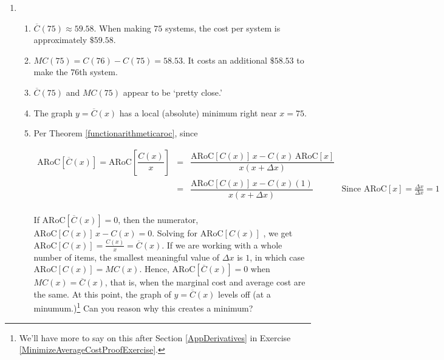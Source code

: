 \begin{enumerate}
\begin{enumerate}
\end{enumerate}

\item \begin{enumerate}  \item $\overline{C}(75) \approx 59.58$.  When making $75$ systems, the cost per system is approximately $\$ 59.58$.

\item $MC(75) = C(76) - C(75) = 58.53$.  It costs an additional $\$ 58.53$ to make the $76$th system.

\item  $\overline{C}(75)$ and $MC(75)$ appear to be `pretty close.'

\item  The graph $y = \overline{C}(x)$  has a local (absolute) minimum right near $x = 75$.

\item  Per Theorem \ref{functionarithmeticaroc}, since 

  \[ \begin{array}{lcrl}
  
  \text{ARoC}[ \overline{C}(x)] = \text{ARoC}\left[\dfrac{C(x)}{x}   \right] & = & \dfrac{ \text{ARoC}[C(x)] \,  x  - C(x)  \, \text{ARoC}[x]}{x (x + \Delta x)} & \\[10pt]  
   & = & \dfrac{ \text{ARoC}[C(x)] \,  x  - C(x)(1) }{x (x +\Delta x)} & \text{Since $\text{ARoC}[x] = \frac{\Delta x}{ \Delta x} = 1$}\\[10pt]  \end{array}\]

If $\text{ARoC}[ \overline{C}(x)]  = 0$, then the numerator,  $\text{ARoC}[C(x)] \,  x  - C(x) = 0$.  Solving for $\text{ARoC}[C(x)]$ , we get  $\text{ARoC}[C(x)] = \frac{C(x)}{x} = \overline{C}(x)$.  If we are working with a whole number of items, the smallest meaningful value of $\Delta x$ is $1$, in which case $\text{ARoC}[C(x)]  = MC(x)$.  Hence,  $\text{ARoC}[ \overline{C}(x)] = 0$ when $MC(x) = \overline{C}(x)$, that is, when  the marginal cost and average cost are the same.  At this point, the graph of $y = \overline{C}(x)$ levels off (at a minumum.)\footnote{We'll have more to say on this after Section \ref{AppDerivatives} in Exercise \ref{MinimizeAverageCostProofExercise}.} Can you reason why this creates a minimum?



\setcounter{HW}{\value{enumi}}

\end{enumerate}

\setcounter{HW}{\value{enumi}}
\end{enumerate}





